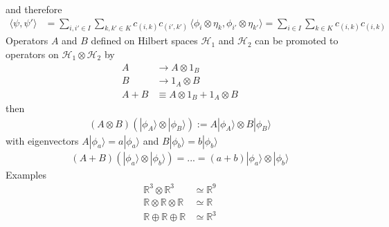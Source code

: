 \documentclass[10pt,a4paper]{book}
\theoremstyle{definition}
\begin{document}
and therefore
\begin{align}
\langle\psi,\psi'\rangle
&=\sum_{i,i'\in I}\sum_{k,k'\in K}c_{(i,k)}c_{(i',k')}\,\langle\phi_i\otimes\eta_k,\phi_{i'}\otimes\eta_{k'}\rangle
=\sum_{i\in I}\sum_{k\in K}c_{(i,k)}c_{(i,k)}
\end{align}
Operators $A$ and $B$ defined on Hilbert spaces $\mathcal{H}_1$ and $\mathcal{H}_2$ can be promoted to operators on $\mathcal{H}_1\otimes\mathcal{H}_2$ by
\begin{align}
A&\rightarrow A\otimes 1_B\\
B&\rightarrow 1_A\otimes B\\
A+B&\equiv A\otimes 1_B + 1_A\otimes B
\end{align}
then
\begin{align}
(A \otimes B)(|\phi_A\rangle\otimes|\phi_B\rangle) 
:=A |\phi_A\rangle\otimes B|\phi_B\rangle
\end{align}
with eigenvectors $A|\phi_a\rangle=a|\phi_a\rangle$ and $B|\phi_b\rangle=b|\phi_b\rangle$
\begin{align}
(A + B)(|\phi_a\rangle\otimes|\phi_b\rangle)=...
=(a+b) |\phi_a\rangle\otimes |\phi_b\rangle
\end{align}
Examples
\begin{align}
\mathbb{R}^3\otimes\mathbb{R}^3&\simeq\mathbb{R}^9\\
\mathbb{R}\otimes\mathbb{R}\otimes\mathbb{R}&\simeq\mathbb{R}\\
\mathbb{R}\oplus\mathbb{R}\oplus\mathbb{R}&\simeq\mathbb{R}^3
\end{align}
\end{document}
